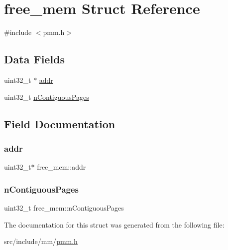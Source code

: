 \hypertarget{structfree__mem}{}\section{free\+\_\+mem Struct Reference}
\label{structfree__mem}


{\ttfamily \#include $<$pmm.\+h$>$}

\subsection*{Data Fields}
\begin{DoxyCompactItemize}
\item 
uint32\+\_\+t $\ast$ \hyperlink{structfree__mem_a9fd472cc2055b3cefa93d0f12c14a459}{addr}
\item 
uint32\+\_\+t \hyperlink{structfree__mem_a3ace604f62d6bd6d7a59d0f78d9826d7}{n\+Contiguous\+Pages}
\end{DoxyCompactItemize}


\subsection{Field Documentation}
\mbox{\label{structfree__mem_a9fd472cc2055b3cefa93d0f12c14a459}} 
\subsubsection{\texorpdfstring{addr}{addr}}
{\footnotesize\ttfamily uint32\+\_\+t$\ast$ free\+\_\+mem\+::addr}

\mbox{\label{structfree__mem_a3ace604f62d6bd6d7a59d0f78d9826d7}} 
\subsubsection{\texorpdfstring{n\+Contiguous\+Pages}{nContiguousPages}}
{\footnotesize\ttfamily uint32\+\_\+t free\+\_\+mem\+::n\+Contiguous\+Pages}



The documentation for this struct was generated from the following file\+:\begin{DoxyCompactItemize}
\item 
src/include/mm/\hyperlink{pmm_8h}{pmm.\+h}\end{DoxyCompactItemize}
